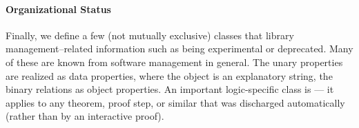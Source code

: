 \paragraph{Organizational Status}
Finally, we define a few (not mutually exclusive) classes that library management--related information such as being experimental or deprecated.
Many of these are known from software management in general.
The unary properties are realized as data properties, where the object is an explanatory string, the binary relations as object properties. 
An important logic-specific class is  --- it applies to any theorem, proof step, or similar that was discharged automatically (rather than by an interactive proof).


